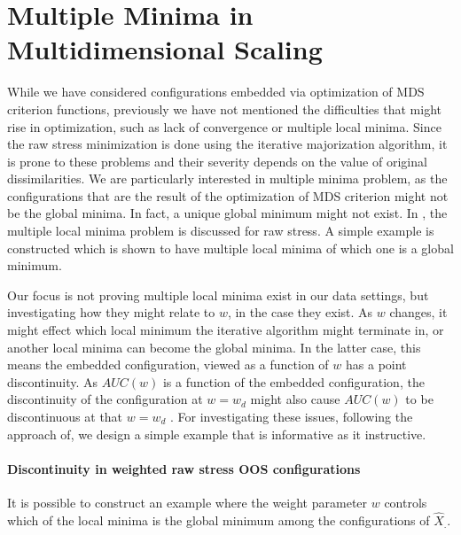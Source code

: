 \documentclass[12pt,oneside,final]{thesis}\usepackage[]{graphicx}\usepackage[]{color}
\begin{document}
\chapter{Multiple Minima in  Multidimensional Scaling }
\label{sec:MultMinima}


While we have considered  configurations embedded via optimization of  MDS criterion functions, previously  we have not mentioned  the difficulties that might rise in optimization, such as lack of convergence or multiple local minima. Since the raw stress minimization is done using the iterative majorization algorithm, it is prone to these problems and their severity depends on the value of  original dissimilarities. We are particularly interested in multiple minima problem, as the configurations that are the result of the optimization of MDS criterion might not be the global minima. In fact, a unique global minimum might not exist. In \cite{TrossetLocalMin}, the multiple local minima problem is discussed for raw stress. A simple example is constructed which is shown to have multiple local minima of which one is a global minimum.


Our focus is not proving  multiple local minima  exist in our data settings, but investigating how they might relate to $w$, in the case they exist. As $w$ changes, it might effect which local minimum  the iterative algorithm might terminate in, or another local minima can become the global minima. In the latter case, this means the embedded configuration, viewed as a function of $w$ has a point discontinuity. As $AUC(w)$ is a function of the embedded configuration, the discontinuity of the configuration at $w= w_{d}$ might also cause $AUC(w)$ to be discontinuous at that $w=w_{d}$ .   For investigating these issues, following the approach of\cite{TrossetLocalMin}, we design a simple example that is informative as it instructive.  

\subsubsection{ Discontinuity in weighted raw stress OOS configurations\label{subsubsec:Discontinuity}}
 It is  possible to construct an example  where the weight parameter $w$ controls which of the local minima is the global minimum among the configurations of $\hat{X}_{.}$.

\end{document}
